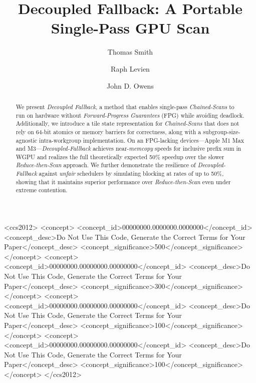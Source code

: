 \documentclass[sigconf]{acmart}
\begin{document}
\title{Decoupled Fallback: A Portable Single-Pass GPU Scan}

\author{Thomas Smith}

\author{Raph Levien}

\author{John D. Owens}

\renewcommand{\shortauthors}{Smith et al.}

\begin{abstract}
  We present \emph{Decoupled Fallback}, a method that enables single-pass \emph{Chained-Scans} to run on hardware without \emph{Forward-Progress Guarantees} (FPG) while avoiding deadlock. Additionally, we introduce a tile state representation for \emph{Chained-Scans} that does not rely on 64-bit atomics or memory barriers for correctness, along with a subgroup-size-agnostic intra-workgroup implementation. On an FPG-lacking devices---Apple M1 Max and M3---\emph{Decoupled-Fallback} achieves near-\emph{memcopy} speeds for inclusive prefix sum in WGPU and realizes the full theoretically expected 50\% speedup over the slower \emph{Reduce-then-Scan} approach. We further demonstrate the resilience of \emph{Decoupled-Fallback} against \emph{unfair} schedulers by simulating blocking at rates of up to 50\%, showing that it maintains superior performance over \emph{Reduce-then-Scan} even under extreme contention.
\end{abstract}

\begin{CCSXML}
  <ccs2012>
  <concept>
  <concept_id>00000000.0000000.0000000</concept_id>
  <concept_desc>Do Not Use This Code, Generate the Correct Terms for Your Paper</concept_desc>
  <concept_significance>500</concept_significance>
  </concept>
  <concept>
  <concept_id>00000000.00000000.00000000</concept_id>
  <concept_desc>Do Not Use This Code, Generate the Correct Terms for Your Paper</concept_desc>
  <concept_significance>300</concept_significance>
  </concept>
  <concept>
  <concept_id>00000000.00000000.00000000</concept_id>
  <concept_desc>Do Not Use This Code, Generate the Correct Terms for Your Paper</concept_desc>
  <concept_significance>100</concept_significance>
  </concept>
  <concept>
  <concept_id>00000000.00000000.00000000</concept_id>
  <concept_desc>Do Not Use This Code, Generate the Correct Terms for Your Paper</concept_desc>
  <concept_significance>100</concept_significance>
  </concept>
  </ccs2012>
\end{CCSXML}
\end{document}
